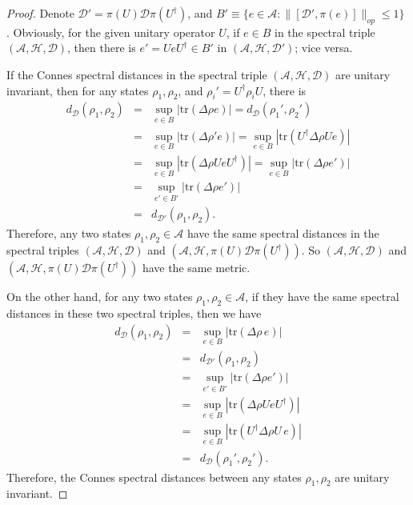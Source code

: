 \documentclass[a4paper,12pt]{article}
\begin{document}
\begin{proof}
Denote
$\mathcal{D}' = \pi (U) \mathcal{D} \pi (U^{\dag})$,
and $B' \equiv \{e \in \mathcal{A}: \|[\mathcal{D}', \pi (e)]\|_{op}
\leqslant 1\}$ .
Obviously, for the given unitary operator $U$, if $e \in B$ in the
spectral triple $(\mathcal{A}, \mathcal{H}, \mathcal{D})$, then there is $e' =
UeU^{\dag} \in B'$ in $(\mathcal{A}, \mathcal{H}, \mathcal{D}')$; vice
versa.

If the Connes spectral distances in the spectral
triple $(\mathcal{A}, \mathcal{H}, \mathcal{D})$ are unitary invariant, then
for any states $\rho_1, \rho_2$, and $\rho_i' = U^{\dag} \rho_i U$, there is
\begin{eqnarray}
  d_{\mathcal{D}} (\rho_1, \rho_2) & = & \sup_{e \in B} | \mathrm{tr} (\Delta
  \rho e) | = d_{\mathcal{D}} (\rho_1', \rho_2') \nonumber\\
  & = & \sup_{e \in B} | \mathrm{tr} (\Delta \rho' e) | = \sup_{e \in B} |
  \mathrm{tr} (U^{\dag} \Delta \rho U e) | \nonumber\\
  & = & \sup_{e \in B} | \mathrm{tr} (\Delta \rho U eU^{\dag}) | = \sup_{e
  \in B} | \mathrm{tr} (\Delta \rho e') | \nonumber\\
  & = & \sup_{e' \in B'} | \mathrm{tr} (\Delta \rho e') | \nonumber\\
  & = & d_{\mathcal{D}'} (\rho_1, \rho_2) . 
\end{eqnarray}
Therefore, any two states $\rho_1, \rho_2\in\mathcal{A}$ have the same spectral distances in
the spectral triples $(\mathcal{A}, \mathcal{H}, \mathcal{D})$ and
$(\mathcal{A}, \mathcal{H}, \pi (U)\mathcal{D} \pi (U^{\dag}))$. So
$(\mathcal{A}, \mathcal{H}, \mathcal{D})$ and $(\mathcal{A}, \mathcal{H}, \pi
(U)\mathcal{D} \pi (U^{\dag}))$ have the same metric.

On the other hand, for any two states $\rho_1, \rho_2\in\mathcal{A}$, if they have the same
spectral distances in these two spectral triples, then we have
\begin{eqnarray}
  d_{\mathcal{D}} (\rho_1, \rho_2) & = & \sup_{e \in B} | \mathrm{tr} (\Delta
  \rho \, e) | \nonumber\\
  & = & d_{\mathcal{D}'} (\rho_1, \rho_2) \nonumber\\
  & = & \sup_{e' \in B'} | \mathrm{tr} (\Delta \rho e') | \nonumber\\
  & = & \sup_{e \in B} | \mathrm{tr} (\Delta \rho UeU^{\dag}) | \nonumber\\
  & = & \sup_{e \in B} | \mathrm{tr} (U^{\dag} \Delta \rho U \,
  e) | \nonumber\\
  & = & d_{\mathcal{D}} (\rho_1', \rho_2') . 
\end{eqnarray}
Therefore, the Connes spectral distances between any states $\rho_1, \rho_2$
are unitary invariant.
\end{proof}
\end{document}
